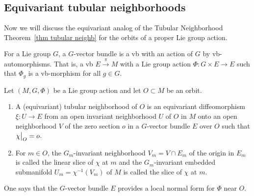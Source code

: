 \subsection{Equivariant tubular neighborhoods}

Now we will discuss the equivariant analog of the Tubular Neighborhood Theorem~\ref{thm tubular neighb} for the orbits of a proper Lie group action.

\begin{defn}
    For a Lie group $G$, a $G$-vector bundle is a \gls{vb} with an action of $G$ by \gls{vb}-automorphisms. That is, a \gls{vb} $E\overset{\pi}{\to}M$ with a Lie group action $\Phi:G\times E\to E$ such that $\Phi_g$ is a \gls{vb}-morphism for all $g\in G$.
\end{defn}

\begin{defn}
    Let $(M,G,\Phi)$ be a Lie group action and let $O\subset M$ be an orbit.
    \begin{enumerate}
        \item A (equivariant) tubular neighborhood of $O$ is an equivariant diffeomorphism $\xi:U\to E$  from an open invariant neighborhood $U$ of $O$ in $M$ onto an open neighborhood $V$ of the zero section $o$ in a $G$-vector bundle $E$ over $O$ such that $\restr{\chi}{O}=o$.
        \item For $m\in O$, the $G_m$-invariant neighborhood $V_m=V\cap E_m$ of the origin in $E_m$ is called the linear slice of $\chi$ at $m$ and the $G_m$-invariant embedded submanifold $U_m=\chi^{-1}(V_m)$ of $M$ is called the slice of $\chi$ at $m$.
    \end{enumerate}
    One says that the $G$-vector bundle $E$ provides a local normal form for $\Phi$ near $O$.
\end{defn}

